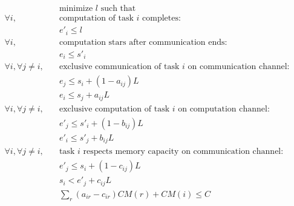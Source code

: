 \documentclass[sigconf]{acmart}
\begin{document}
	\vspace*{-0.5cm}
	\begin{align*}
		& \text{minimize } l \text{ such that }\\
		\forall i, \quad & \text{computation of task } i \text{ completes:}\\
		& e'_i \leq l\\
		\forall i, \quad & \text{computation stars after communication ends:}\\
		& e_i \leq s'_i\\
		\forall i, \forall j\ne i, \quad & \text{exclusive communication of task } i \text{ on communication channel:}\\
		& e_j \leq s_i +(1-a_{ij})L\\
		& e_i\leq s_j +a_{ij}L\\
		\forall i, \forall j\ne i, \quad & \text{exclusive computation of task } i \text{ on computation channel:}\\
		& e'_j \leq s'_i +(1-b_{ij})L\\
		& e'_i\leq s'_j +b_{ij}L\\
		\forall i, \forall j\ne i, \quad & \text{task } i \text{ respects memory capacity on communication channel:}\\
		& e'_j \leq s_i +(1-c_{ij})L\\
		& s_i< e'_j +c_{ij}L\\
		& \sum_r (a_{ir} - c_{ir})CM(r) + CM(i) \le C\\
	\end{align*} 
\end{document}
